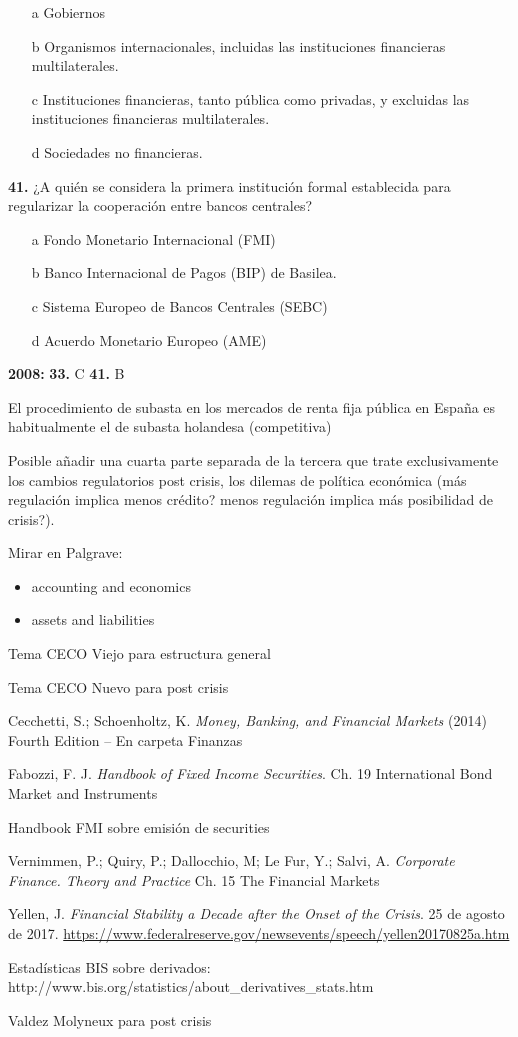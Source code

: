 \documentclass{nuevotema}
\begin{document}
\begin{itemize}
	\item[a] Gobiernos
	\item[b] Organismos internacionales, incluidas las instituciones financieras multilaterales.
	\item[c] Instituciones financieras, tanto pública como privadas, y excluidas las instituciones financieras multilaterales.
	\item[d] Sociedades no financieras.
\end{itemize}

\textbf{41.} ¿A quién se considera la primera institución formal establecida para regularizar la cooperación entre bancos centrales?

\begin{itemize}
	\item[a] Fondo Monetario Internacional (FMI)
	\item[b] Banco Internacional de Pagos (BIP) de Basilea.
	\item[c] Sistema Europeo de Bancos Centrales (SEBC)
	\item[d] Acuerdo Monetario Europeo (AME)
\end{itemize}

\notas

\textbf{2008:} \textbf{33.} C \textbf{41.} B

El procedimiento de subasta en los mercados de renta fija pública en España es habitualmente el de subasta holandesa (competitiva)

Posible añadir una cuarta parte separada de la tercera que trate exclusivamente los cambios regulatorios post crisis, los dilemas de política económica (más regulación implica menos crédito? menos regulación implica más posibilidad de crisis?).


\bibliografia

Mirar en Palgrave:
\begin{itemize}
	\item accounting and economics
	\item assets and liabilities
\end{itemize}

Tema CECO Viejo para estructura general

Tema CECO Nuevo para post crisis

Cecchetti, S.; Schoenholtz, K. \textit{Money, Banking, and Financial Markets} (2014) Fourth Edition -- En carpeta Finanzas

Fabozzi, F. J. \textit{Handbook of Fixed Income Securities}. Ch. 19 International Bond Market and Instruments

Handbook FMI sobre emisión de securities

Vernimmen, P.; Quiry, P.; Dallocchio, M; Le Fur, Y.; Salvi, A. \textit{Corporate Finance. Theory and Practice} Ch. 15 The Financial Markets

Yellen, J. \textit{Financial Stability a Decade after the Onset of the Crisis}. 25 de agosto de 2017. \url{https://www.federalreserve.gov/newsevents/speech/yellen20170825a.htm}

Estadísticas BIS sobre derivados: http://www.bis.org/statistics/about\_derivatives\_stats.htm

Valdez Molyneux para post crisis
\end{document}
